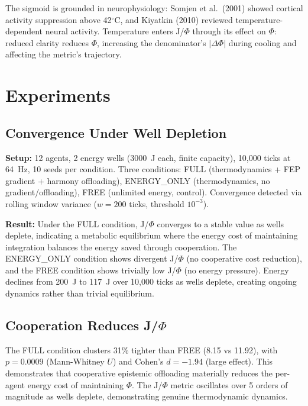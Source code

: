 \documentclass[entropy,article]{Definitions/mdpi}
\begin{document}
The sigmoid is grounded in neurophysiology: Somjen et al.\ (2001) showed cortical activity suppression above 42$^\circ$C, and Kiyatkin (2010) reviewed temperature-dependent neural activity. Temperature enters J/$\Phi$ through its effect on $\Phi$: reduced clarity reduces $\Phi$, increasing the denominator's $|\Delta\Phi|$ during cooling and affecting the metric's trajectory.

\section{Experiments}
\label{sec:experiments}

\subsection{Convergence Under Well Depletion}
\label{sec:convergence}

\textbf{Setup:} 12 agents, 2 energy wells (3000~J each, finite capacity), 10{,}000 ticks at 64~Hz, 10 seeds per condition. Three conditions: FULL (thermodynamics + FEP gradient + harmony offloading), ENERGY\_ONLY (thermodynamics, no gradient/offloading), FREE (unlimited energy, control). Convergence detected via rolling window variance ($w = 200$ ticks, threshold $10^{-3}$).

\textbf{Result:} Under the FULL condition, J/$\Phi$ converges to a stable value as wells deplete, indicating a metabolic equilibrium where the energy cost of maintaining integration balances the energy saved through cooperation. The ENERGY\_ONLY condition shows divergent J/$\Phi$ (no cooperative cost reduction), and the FREE condition shows trivially low J/$\Phi$ (no energy pressure). Energy declines from 200~J to 117~J over 10{,}000 ticks as wells deplete, creating ongoing dynamics rather than trivial equilibrium.

\subsection{Cooperation Reduces J/$\Phi$}
\label{sec:cooperation}

The FULL condition clusters 31\% tighter than FREE (8.15 vs 11.92), with $p = 0.0009$ (Mann-Whitney $U$) and Cohen's $d = -1.94$ (large effect). This demonstrates that cooperative epistemic offloading materially reduces the per-agent energy cost of maintaining $\Phi$. The J/$\Phi$ metric oscillates over 5 orders of magnitude as wells deplete, demonstrating genuine thermodynamic dynamics.
\end{document}
